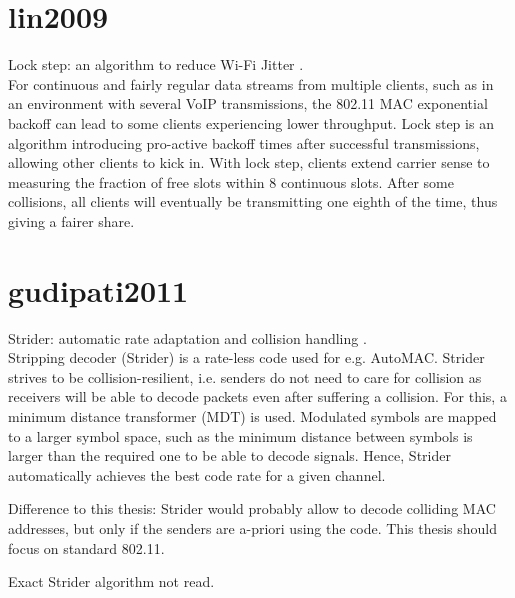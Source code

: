 
\section{lin2009}

Lock step: an algorithm to reduce Wi-Fi Jitter \cite{lin2009}.\\

For continuous and fairly regular data streams from multiple clients, such as in an environment with several VoIP transmissions, the 802.11 MAC exponential backoff can lead to some clients experiencing lower throughput. Lock step is an algorithm introducing pro-active backoff times after successful transmissions, allowing other clients to kick in. With lock step, clients extend carrier sense to measuring the fraction of free slots within 8 continuous slots. After some collisions, all clients will eventually be transmitting one eighth of the time, thus giving a fairer share.



\section{gudipati2011}

Strider: automatic rate adaptation and collision handling \cite{gudipati2011}.\\

Stripping decoder (Strider) is a rate-less code used for e.g. AutoMAC. Strider strives to be collision-resilient, i.e. senders do not need to care for collision as receivers will be able to decode packets even after suffering a collision. For this, a minimum distance transformer (MDT) is used. Modulated symbols are mapped to a larger symbol space, such as the minimum distance between symbols is larger than the required one to be able to decode signals. Hence, Strider automatically achieves the best code rate for a given channel.

Difference to this thesis: Strider would probably allow to decode colliding MAC addresses, but only if the senders are a-priori using the code. This thesis should focus on standard 802.11.

Exact Strider algorithm not read.



